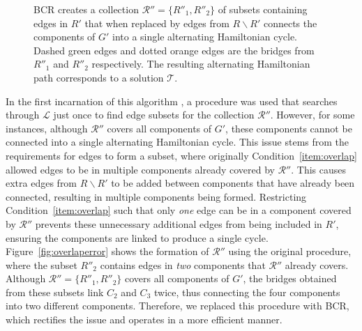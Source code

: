 \documentclass[a4paper,11pt,authoryear]{elsarticle}
\begin{document}
\begin{figure}[h]	
	\centering
	\begin{subfigure}[h]{0.35\textwidth}
		
		\caption{}
		\label{fig:bcrlist}
	\end{subfigure} \hspace{7mm} %
	\begin{subfigure}[h]{0.25\textwidth}
		
		\caption{}
		\label{fig:mpsconnect}
	\end{subfigure} \hspace{7mm} %
	\begin{subfigure}[h]{0.25\textwidth}
		
		\caption{}
		\label{fig:mpscycle}
	\end{subfigure}
	\begin{subfigure}[h]{0.75\textwidth}
		
		\caption{}
		\label{fig:solutionpath}
	\end{subfigure}
	\caption{BCR creates a collection $\mathcal{R}'' = \{R''_1, R''_2\}$ of subsets containing edges in $R'$ that when replaced by edges from $R\backslash R'$ connects the components of $G'$ into a single alternating Hamiltonian cycle. Dashed green edges and dotted orange edges are the bridges from $R''_1$ and $R''_2$ respectively. The resulting alternating Hamiltonian path corresponds to a solution $\mathcal{T}$.}
	\label{fig:bcr}
\end{figure}

In the first incarnation of this algorithm \citep{becker2010}, a procedure was used that searches through $\mathcal{L}$ just once to find edge subsets for the collection $\mathcal{R}''$. However, for some instances, although $\mathcal{R}''$ covers all components of $G'$, these components cannot be connected into a single alternating Hamiltonian cycle. This issue stems from the requirements for edges to form a subset, where originally Condition~\ref{item:overlap} allowed edges to be in multiple components already covered by $\mathcal{R}''$. This causes extra edges from $R \backslash R'$ to be added between components that have already been connected, resulting in multiple components being formed. Restricting Condition~\ref{item:overlap} such that only \emph{one} edge can be in a component covered by $\mathcal{R}''$ prevents these unnecessary additional edges from being included in $R'$, ensuring the components are linked to produce a single cycle. Figure~\ref{fig:overlaperror} shows the formation of $\mathcal{R}''$ using the original procedure, where the subset $R''_2$ contains edges in \emph{two} components that $\mathcal{R}''$ already covers. Although $\mathcal{R}'' = \{R''_1, R''_2\}$ covers all components of $G'$, the bridges obtained from these subsets link $C_2$ and $C_3$ twice, thus connecting the four components into two different components. Therefore, we replaced this procedure with BCR, which rectifies the issue and operates in a more efficient manner.
\end{document}
